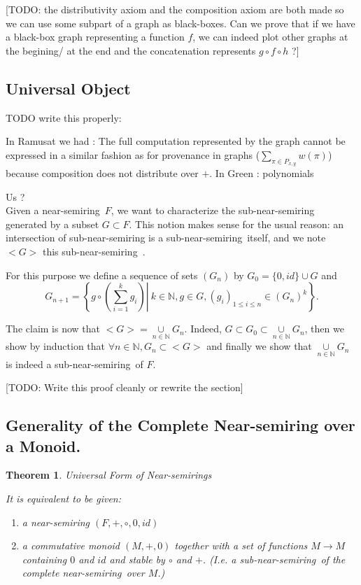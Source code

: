 \documentclass[11pt,a4paper]{article}
\newcommand{\bb}[1]{\mathbb{#1}}
\newcommand{\N}{\bb{N}}
\newcommand{\Ns}{near-semiring}
\newcommand{\sns}{sub-near-semiring}
\newtheorem{theorem}{Theorem}
\theoremstyle{definition}
\renewcommand{\leq}{\leqslant}
\begin{document}
[TODO: the distributivity axiom and the composition axiom are both made so we can use some subpart of a graph as black-boxes. Can we prove that if we have a black-box graph representing a function $f$, we can indeed plot other graphs at the begining/ at the end and the concatenation represents $g\circ  f \circ h$ ?]

\subsection{Universal Object}

TODO write this properly:

In Ramusat we had :
	The full computation represented by the graph cannot be expressed in a similar fashion as for provenance in graphs ($\underset{\pi \in P_{x,y}}{\sum} w(\pi)$) because composition does not distribute over $+$.
In Green : polynomials

Us ?
\\


Given a \Ns\ $F$, we want to characterize the sub-near-semiring generated by a subset $G \subset F$. This notion makes sense for the usual reason: an intersection of sub-near-semiring is a \sns\ itself, and we note $<G>$ this \sns\ .

For this purpose we define a sequence of sets $(G_n)$ by $G_0=\{0,id\} \cup G$ and 
$$G_{n+1} = \left\{ \left. g \circ \left( \overset{k}{\underset{i=1}{\sum}} g_i \right) \right| \ k \in \N, g \in G, (g_i)_{1 \leq i \leq n} \in (G_n)^k \right\} .$$

	The claim is now that $<G> = \underset{n \in \N}{\cup} G_n$. Indeed, $G \subset G_0 \subset \underset{n \in \N}{\cup} G_n$, then we show by induction that $\forall n \in \N, G_n \subset <G>$ and finally we show that $\underset{n \in \N}{\cup} G_n$ is indeed a \sns\ of $F$.
	
	[TODO: Write this proof cleanly or rewrite the section]

\subsection{Generality of the Complete Near-semiring over a Monoid.}

\begin{theorem}{Universal Form of Near-semirings}
\label{thm:near_semirings_fun_monoids}

	It is equivalent to be given:

	\begin{enumerate}

		\item a near-semiring $(F,+,\circ,0,id)$

		\item a commutative monoid $(M,+,0)$ together with a set of functions $M \to M$ containing $0$ and $id$ and stable by $\circ$ and $+$. (I.e. a \sns\ of the complete \Ns\ over $M$.)

	\end{enumerate}

\end{theorem}
\end{document}

